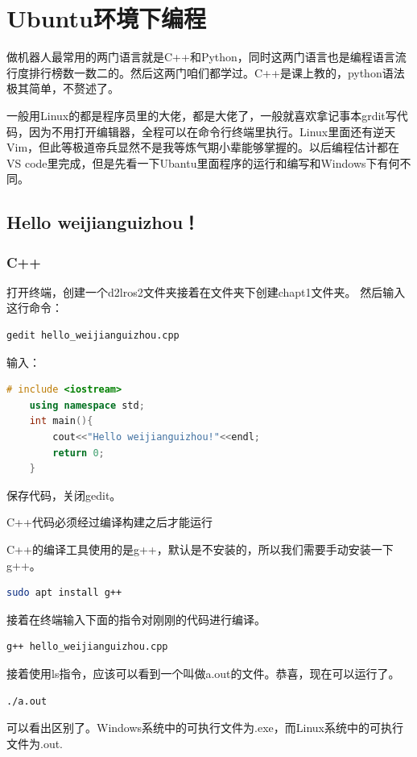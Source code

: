 \documentclass[12pt,a4paper]{ctexbook}
\begin{document}
\fi

\chapter{Ubuntu环境下编程}
做机器人最常用的两门语言就是C++和Python，同时这两门语言也是编程语言流行度排行榜数一数二的。然后这两门咱们都学过。C++是课上教的，python语法极其简单，不赘述了。

一般用Linux的都是程序员里的大佬，都是大佬了，一般就喜欢拿记事本grdit写代码，因为不用打开编辑器，全程可以在命令行终端里执行。Linux里面还有逆天Vim，但此等极道帝兵显然不是我等炼气期小辈能够掌握的。以后编程估计都在VS code里完成，但是先看一下Ubantu里面程序的运行和编写和Windows下有何不同。
\section{Hello weijianguizhou！}
\subsection{C++}
打开终端，创建一个d2lros2文件夹接着在文件夹下创建chapt1文件夹。
然后输入这行命令：
\begin{lstlisting}[language=bash,title={用gedit创建并打开cpp文件}]
    gedit hello_weijianguizhou.cpp
\end{lstlisting}
输入：
\begin{lstlisting}[language=c++,title={cpp程序}]
    # include <iostream>
    using namespace std;
    int main(){
    	cout<<"Hello weijianguizhou!"<<endl;
    	return 0;
    }
\end{lstlisting}
保存代码，关闭gedit。

C++代码必须经过编译构建之后才能运行

C++的编译工具使用的是g++，默认是不安装的，所以我们需要手动安装一下g++。
\begin{lstlisting}[language=bash,title={安装g++编译器}]
    sudo apt install g++
\end{lstlisting}
接着在终端输入下面的指令对刚刚的代码进行编译。
\begin{lstlisting}[language=bash,title={编译C++}]
    g++ hello_weijianguizhou.cpp
\end{lstlisting}
接着使用ls指令，应该可以看到一个叫做a.out的文件。恭喜，现在可以运行了。
\begin{lstlisting}[language=bash,title={运行C++}]
    ./a.out
\end{lstlisting}
可以看出区别了。Windows系统中的可执行文件为.exe，而Linux系统中的可执行文件为.out.
\end{document}
